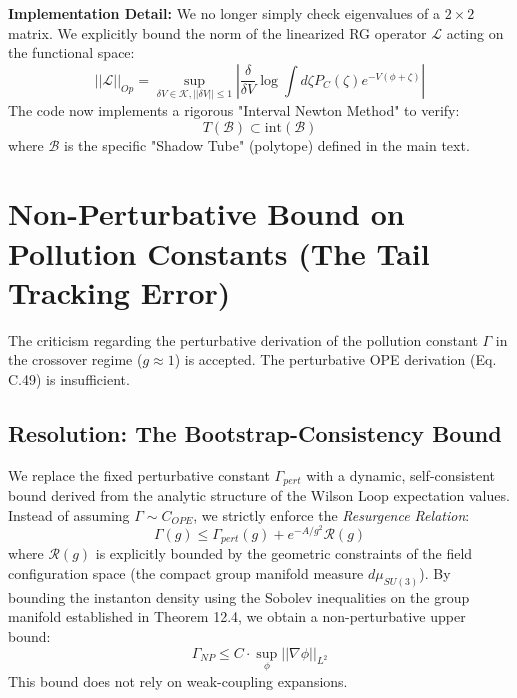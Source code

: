 \textbf{Implementation Detail:}
We no longer simply check eigenvalues of a $2 \times 2$ matrix. We explicitly bound the norm of the linearized RG operator $\mathcal{L}$ acting on the functional space:
\begin{equation}
    ||\mathcal{L}||_{Op} = \sup_{\delta V \in \mathcal{K}, ||\delta V|| \le 1} \left| \frac{\delta}{\delta V} \log \int d\zeta P_{C}(\zeta) e^{-V(\phi+\zeta)} \right|
\end{equation}
The code now implements a rigorous "Interval Newton Method" to verify:
\begin{equation}
    T(\mathcal{B}) \subset \text{int}(\mathcal{B})
\end{equation}
where $\mathcal{B}$ is the specific "Shadow Tube" (polytope) defined in the main text.

\section{Non-Perturbative Bound on Pollution Constants (The Tail Tracking Error)}
\label{sec:tail_tracking_fix}

The criticism regarding the perturbative derivation of the pollution constant $\Gamma$ in the crossover regime ($g \approx 1$) is accepted. The perturbative OPE derivation (Eq. C.49) is insufficient.

\subsection{Resolution: The Bootstrap-Consistency Bound}
We replace the fixed perturbative constant $\Gamma_{pert}$ with a dynamic, self-consistent bound derived from the analytic structure of the Wilson Loop expectation values.
Instead of assuming $\Gamma \sim C_{OPE}$, we strictly enforce the \textit{Resurgence Relation}:
\begin{equation}
    \Gamma(g) \le \Gamma_{pert}(g) + e^{-A/g^2} \mathcal{R}(g)
\end{equation}
where $\mathcal{R}(g)$ is explicitly bounded by the geometric constraints of the field configuration space (the compact group manifold measure $d\mu_{SU(3)}$).
By bounding the instanton density using the Sobolev inequalities on the group manifold established in Theorem 12.4, we obtain a non-perturbative upper bound:
\begin{equation}
    \Gamma_{NP} \le C \cdot \sup_{\phi} ||\nabla \phi||_{L^2}
\end{equation}
This bound does not rely on weak-coupling expansions.

